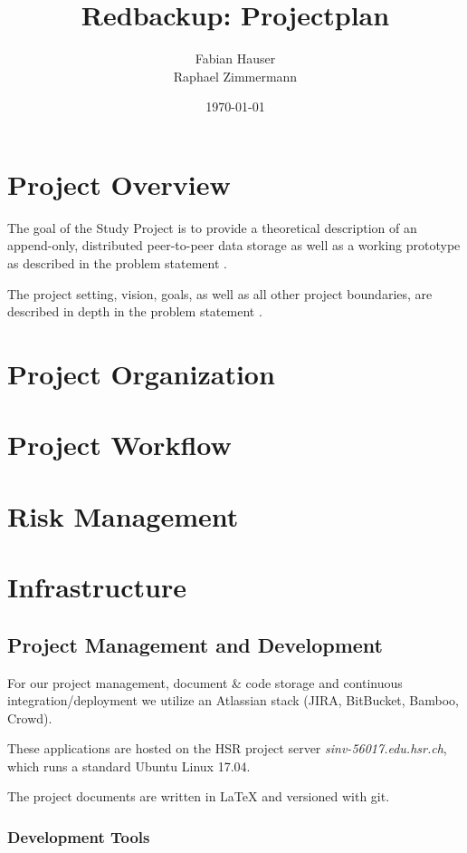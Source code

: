 \documentclass[a4paper]{article}
\title{Redbackup: Projectplan}
\author{
		Fabian Hauser \\
		Raphael Zimmermann
}
\date{\today}
\begin{document}
\maketitle

\section{Project Overview}
The goal of the Study Project is to provide a theoretical description of an append-only, distributed peer-to-peer data storage as well as a working prototype as described in the problem statement \cite{problemstatement}.

The project setting, vision, goals, as well as all other project boundaries, are described in depth in the problem statement \cite{problemstatement}.

\section{Project Organization}


\section{Project Workflow}


\section{Risk Management}

\section{Infrastructure}


\subsection{Project Management and Development}

For our project management, document \& code storage and continuous integration/deployment we utilize an Atlassian stack (JIRA, BitBucket, Bamboo, Crowd)\cite{atlassian-opensource}.

These applications are hosted on the HSR project server \textit{sinv-56017.edu.hsr.ch}, which runs a standard Ubuntu Linux 17.04.

The project documents are written in LaTeX and versioned with git.

\subsubsection{Development Tools}
\end{document}
